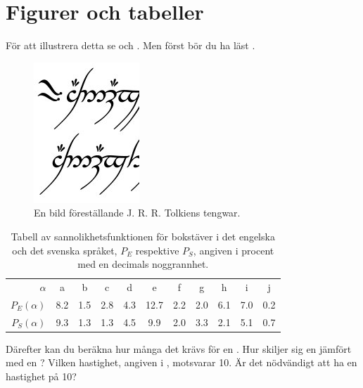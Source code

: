 \documentclass[a4paper]{article}
\begin{document}
	\section{Figurer och tabeller}
	\label{sec:FigTab}
	\noindent
	För att illustrera detta se  och 
	.
	Men först bör du ha läst .

	\begin{figure}
		\centering
		\includegraphics[width=0.2\linewidth]{tengwar.jpg}
		\caption{En bild föreställande J. R. R. Tolkiens tengwar.}
		\label{fig:bild}
	\end{figure}
	\begin{table}
		\centering
		\begin{tabular}{r|cccccccccc}
			\hline\hline
			\(\alpha\) & a & b & c & d & e & f & g & h & i & j \\
			\(P_E(\alpha)\) & 8.2  & 1.5 & 2.8 & 4.3 & 12.7 & 2.2 & 2.0 & 6.1 & 7.0 & 0.2 \\
			\(P_S(\alpha)\) & 9.3  & 1.3 & 1.3 & 4.5 & 9.9 & 2.0 & 3.3 & 2.1 & 5.1 & 0.7 \\
			\hline\hline
		\end{tabular}
		\caption{Tabell av sannolikhetsfunktionen för bokstäver i det engelska och det svenska språket, \(P_E\) respektive \(P_S\), angiven i procent med en decimals noggrannhet.}
		\label{tbl:SannolikhetstabellSpråk}
	\end{table}

	Därefter kan du beräkna hur många \mega\byte{} det krävs för en \giga\byte.
	Hur skiljer sig en \gibi\byte{} jämfört med en \giga\byte?
	Vilken hastighet, angiven i \giga\bit\per\second, motsvarar 
	\unit{10}{\gibi\bit\per\second}.
	Är det nödvändigt att ha en hastighet på \unit{10}{\tera\bit\per\second}?


	
\end{document}
